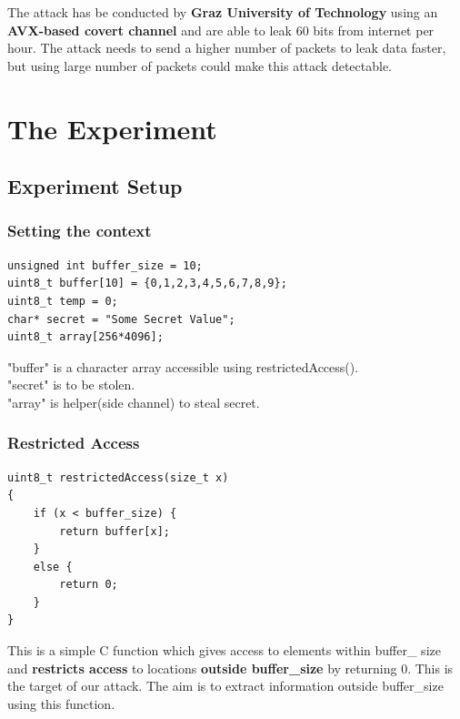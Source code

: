 \documentclass[12pt]{article}
\begin{document}
The attack has be conducted by \textbf{Graz University of Technology}\cite{NETSPECTRE} using an \textbf{AVX-based covert channel} and are able to leak 60 bits from internet per hour. The attack needs to send a higher number of packets to leak data faster, but using large number of packets could make this attack detectable.
\newpage
\section{The Experiment\cite{SeedLabs}}

\subsection{Experiment Setup}

\subsubsection{Setting the context}
\begin{lstlisting}[style=CStyle]
unsigned int buffer_size = 10;
uint8_t buffer[10] = {0,1,2,3,4,5,6,7,8,9};
uint8_t temp = 0;
char* secret = "Some Secret Value";
uint8_t array[256*4096];
\end{lstlisting}
"buffer" is a character array accessible using restrictedAccess().\\
"secret" is to be stolen.\\
"array" is helper(side channel) to steal secret.  

\subsubsection{Restricted Access}
\begin{lstlisting}[style=CStyle]
uint8_t restrictedAccess(size_t x)
{
	if (x < buffer_size) {
		return buffer[x];
	} 
	else {
		return 0;
	}
}
\end{lstlisting}
This is a simple C function which gives access to elements within buffer\_ size and \textbf{restricts access} to locations \textbf{outside buffer\_size} by returning 0. This is the target of our attack. The aim is to extract information outside buffer\_size using this function. 
\end{document}
